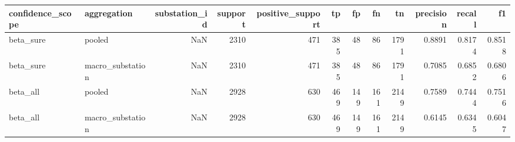 \begin{tabular}{llrrrrrrrrrr}
\toprule
confidence_scope & aggregation & substation_id & support & positive_support & tp & fp & fn & tn & precision & recall & f1 \\
\midrule
beta_sure & pooled & NaN & 2310 & 471 & 385 & 48 & 86 & 1791 & 0.8891 & 0.8174 & 0.8518 \\
beta_sure & macro_substation & NaN & 2310 & 471 & 385 & 48 & 86 & 1791 & 0.7085 & 0.6852 & 0.6806 \\
beta_all & pooled & NaN & 2928 & 630 & 469 & 149 & 161 & 2149 & 0.7589 & 0.7444 & 0.7516 \\
beta_all & macro_substation & NaN & 2928 & 630 & 469 & 149 & 161 & 2149 & 0.6145 & 0.6345 & 0.6047 \\
\bottomrule
\end{tabular}
